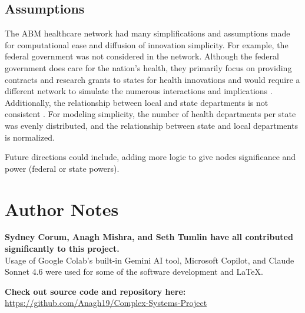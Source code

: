 \documentclass[12pt]{article}
\begin{document}
\subsection{Assumptions}
The ABM healthcare network had many simplifications and assumptions made for computational ease and diffusion of innovation simplicity. For example, the federal government was not considered in the network. Although the federal government does care for the nation’s health, they primarily focus on providing contracts and research grants to states for health innovations and would require a different network to simulate the numerous interactions and implications \cite{health_summary_1988}. Additionally, the relationship between local and state departments is not consistent \cite{health_summary_1988}. For modeling simplicity, the number of health departments per state was evenly distributed, and the relationship between state and local departments is normalized. 

Future directions could include, adding more logic to give nodes significance and power (federal or state powers).

\section*{Author Notes}
\textbf{Sydney Corum, Anagh Mishra, and Seth Tumlin have all contributed significantly to this project.}
\\
Usage of Google Colab’s built-in Gemini AI tool, Microsoft Copilot, and Claude Sonnet 4.6 were used for some of the software development and \LaTeX. 

\textbf{Check out source code and repository here:}\\ 
\centering
\url{https://github.com/Anagh19/Complex-Systems-Project}
\printbibliography
\end{document}
